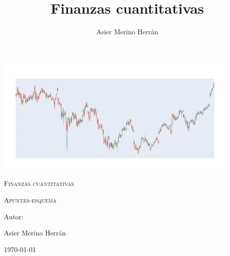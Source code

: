 \documentclass{article}
\title{Finanzas cuantitativas}
\author{Asier Merino Herrán}
\begin{document}
\begin{titlepage}
    \centering
    \vspace{3cm}
    {\includegraphics[width=0.9\textwidth]{newplot.png}\par}
    \vspace{5cm}
    {\scshape\Huge Finanzas cuantitativas \par}
    \vspace{2cm}
    {\scshape\LARGE Apuntes-esquema \par}
    \vfill
    {\Large Autor:  \par}
    {\Large Asier Merino Herrán \par}
    \vfill
    {\Large \today \par}
\end{titlepage}


\cleardoublepage
\tableofcontents
\setcounter{page}{1}
\cleardoublepage


\newpage

\newpage

\newpage

\newpage

\newpage



\cleardoublepage
%
\end{document}
